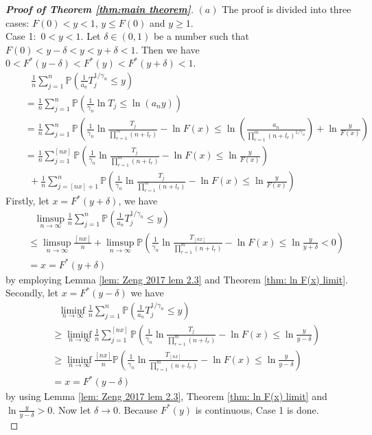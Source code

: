 \documentclass[12pt]{article}
\theoremstyle{plain}
\theoremstyle{definition}
\theoremstyle{remark}
\begin{document}
\begin{proof}[\textit{\textbf{Proof of Theorem \ref{thm:main theorem}}}]
	
$(a)$ The proof is divided into three cases: $F(0)<y<1$, $y\leq F(0)$ and $y\geq 1$.\\
Case 1:\ $0<y<1$. Let $\delta \in(0,1)$ be a number such that $F(0)<y-\delta<y<y+\delta<1$. Then we have $0<F^{*}(y-\delta)<F^{*}(y)<F^{*}(y+\delta)<1$.
\begin{eqnarray*}
&&\ \ \     \frac{1}{n} \sum_{j=1}^{n} \mathbb{P}\left(\frac{1}{a_n}T_j^{1 / \gamma_{n}} \leq y\right)\\
&&=\frac{1}{n} \sum_{j=1}^{n} \mathbb{P}\left(\frac{1}{\gamma_{n}}\ln T_{j} \leq  \ln (a_n y)\right)\\
&&=\frac{1}{n} \sum_{j=1}^{n} \mathbb{P}\left(\frac{1}{\gamma_{n}} 
\ln \frac{T_{j}}{\prod_{r=1}^{m}\left(n+l_{r}\right)}-\ln F(x) 
\leq  \ln ( \frac{a_n}{\prod_{r=1}^{m}(n+l_r)^{1/\gamma_{n}}})+\ln \frac{y}{F(x)}   \right)\\
&&=\frac{1}{n} \sum_{j=1}^{[nx]} \mathbb{P}\left(\frac{1}{\gamma_{n}} 
\ln \frac{T_{j}}{\prod_{r=1}^{m}\left(n+l_{r}\right)}-\ln F(x) 
\leq  \ln \frac{y}{F(x)}   \right)\\
&&\ \ +\frac{1}{n} \sum_{j=[nx]+1}^{n} \mathbb{P}\left(\frac{1}{\gamma_{n}} 
\ln \frac{T_{j}}{\prod_{r=1}^{m}\left(n+l_{r}\right)}-\ln F(x) 
\leq  \ln \frac{y}{F(x)}   \right)
\end{eqnarray*}
Firstly, let $x=F^{*}(y+\delta)$, we have 
\begin{eqnarray*}
&&\ \ \  \limsup _{n \rightarrow \infty}   \frac{1}{n} \sum_{j=1}^{n} \mathbb{P}\left(\frac{1}{a_n}T_j^{1 / \gamma_{n}} \leq y\right)\\
&&\leq \limsup _{n \rightarrow \infty}  \frac{[nx]}{n}+ \limsup _{n \rightarrow \infty}  \mathbb{P}\left(\frac{1}{\gamma_{n}} 
\ln \frac{T_{[nx]}}{\prod_{r=1}^{m}\left(n+l_{r}\right)}-\ln F(x) 
\leq  \ln \frac{y}{y+\delta}<0   \right)\\
&&=x=F^{*}(y+\delta)
\end{eqnarray*}
by employing Lemma \ref{lem: Zeng 2017   lem 2.3} and Theorem \ref{thm: ln F(x) limit}.\\
Secondly, let $x=F^{*}(y-\delta)$  we have 
\begin{eqnarray*}
	&&\ \ \  \liminf _{n \rightarrow \infty}   \frac{1}{n} \sum_{j=1}^{n} \mathbb{P}\left(\frac{1}{a_n}T_j^{1 / \gamma_{n}} \leq y\right)\\
	&&\geq \liminf _{n \rightarrow \infty}  \frac{1}{n} \sum_{j=1}^{[nx]} \mathbb{P}\left(\frac{1}{\gamma_{n}} 
	\ln \frac{T_{j}}{\prod_{r=1}^{m}\left(n+l_{r}\right)}-\ln F(x) 
	\leq  \ln \frac{y}{y-\delta}   \right)\\
	&&\geq \liminf _{n \rightarrow \infty}  \frac{[nx]}{n} \mathbb{P}\left(\frac{1}{\gamma_{n}} 
	\ln \frac{T_{[nx]}}{\prod_{r=1}^{m}\left(n+l_{r}\right)}-\ln F(x) 
	\leq  \ln \frac{y}{y-\delta}   \right)\\
	&&=x=F^{*}(y-\delta)
\end{eqnarray*}
by using Lemma \ref{lem: Zeng 2017   lem 2.3}, Theorem \ref{thm: ln F(x) limit} and $\ln \frac{y}{y-\delta}>0$.
Now let $\delta\to 0$. Because $F^*(y)$ is continuous, Case 1 is done.\\


\end{proof}
\end{document}
